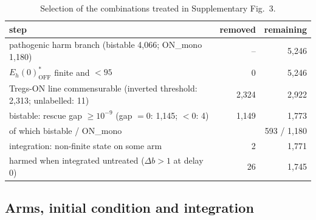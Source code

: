 \documentclass[11pt]{article}
\begin{document}
\begin{table}[H]
\centering
\caption{Selection of the combinations treated in Supplementary Fig.~3.}
\label{tab:harm_gate}
\begin{tabular}{lrr}
\toprule
step & removed & remaining \\
\midrule
pathogenic harm branch (bistable 4{,}066; ON\_mono 1{,}180) & -- & 5,246 \\
$E_h(0)^*_{\mathrm{OFF}}$ finite and $<95$ & 0 & 5,246 \\
Tregs-ON line commensurable (inverted threshold: 2,313; unlabelled: 11) & 2,324 & 2,922 \\
bistable: rescue gap $\ge 10^{-9}$ (gap $=0$: 1,145; $<0$: 4) & 1,149 & 1,773 \\
\quad of which bistable / ON\_mono & & 593 / 1,180 \\
integration: non-finite state on some arm & 2 & 1,771 \\
harmed when integrated untreated ($\Delta b>1$ at delay 0) & 26 & 1,745 \\
\bottomrule
\end{tabular}
\end{table}

\subsection{Arms, initial condition and integration}
\end{document}
